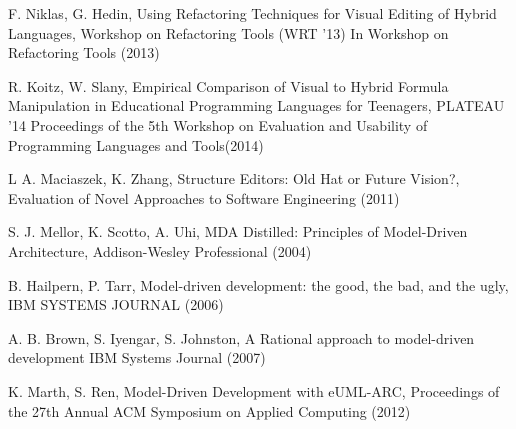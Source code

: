\documentclass[runningheads,a4paper]{llncs}
\begin{document}
\begin{thebibliography}{12}
 F. Niklas, G. Hedin, Using Refactoring Techniques for Visual Editing of Hybrid Languages, Workshop on Refactoring Tools (WRT '13) In Workshop on Refactoring Tools (2013)

 R. Koitz, W. Slany, Empirical Comparison of Visual to Hybrid Formula Manipulation in Educational Programming Languages for Teenagers, PLATEAU '14 Proceedings of the 5th Workshop on Evaluation and Usability of Programming Languages and Tools(2014)

 L A. Maciaszek, K. Zhang, Structure Editors: Old Hat or Future Vision?, Evaluation of Novel Approaches to Software Engineering (2011)

 S. J. Mellor,  K. Scotto,  A. Uhi, MDA Distilled: Principles of Model-Driven Architecture,  Addison-Wesley Professional (2004)

 B. Hailpern,  P. Tarr,  Model-driven development: the good,  the bad,  and the ugly,  IBM SYSTEMS JOURNAL (2006)

 A. B. Brown, S. Iyengar,  S. Johnston, A Rational approach to model-driven development IBM Systems Journal (2007)

 K. Marth,  S. Ren,  Model-Driven Development with eUML-ARC,  Proceedings of the 27th Annual ACM Symposium on Applied Computing (2012)

\end{thebibliography}
\end{document}
